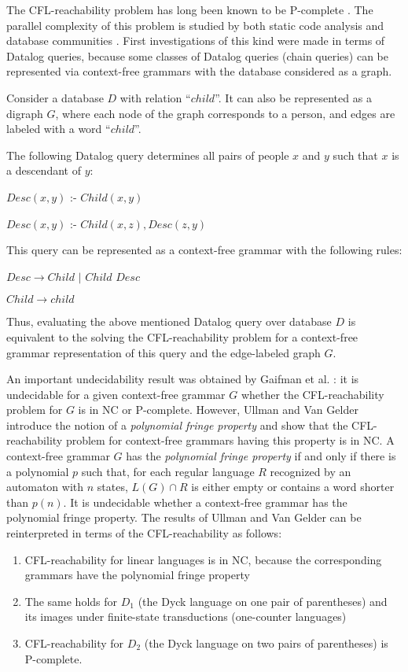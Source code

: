 \documentclass{ws-ijfcs}
\begin{document}
The CFL-reachability problem has long been known to be P-complete \cite{PCompl}. The parallel complexity of this problem is studied by both static code analysis \cite{RepSeq, RepsBasic} and database communities \cite{ChainQ, Ullman, Yannakakis}. First investigations of this kind were made in terms of Datalog queries, because some classes of Datalog queries (chain queries) can be represented via context-free grammars with the database considered as a graph. 
\begin{example}
Consider a database  $D$ with relation ``$child$''. It can also be represented as a digraph $G$, where each node of the graph corresponds to a person, and edges are labeled with a word ``$child$''.


The following Datalog query determines all pairs of people $x$ and $y$ such that $x$ is a descendant of $y$: 


$Desc(x, y)$ :- $Child(x, y)$

$Desc(x, y)$ :- $Child(x, z), Desc(z, y)$


This query can be represented as a context-free grammar with the following rules: 


$Desc \rightarrow Child$ $\vert$ $Child$ $Desc$


$Child  \rightarrow child$


Thus, evaluating the above mentioned Datalog query over database $D$ is equivalent to the solving the CFL-reachability problem for a context-free grammar representation of this query and the edge-labeled graph $G$.
\end{example}
An important undecidability result was obtained by Gaifman et al. \cite{Vardi}:  it is undecidable for a given context-free grammar $G$ whether the CFL-reachability problem for $G$ is in NC or P-complete. However, Ullman and Van Gelder \cite{Ullman} introduce the notion of a \textit{polynomial fringe property} and show that the CFL-reachability problem for context-free grammars having this property is in NC. A context-free grammar $G$ has the \textit{polynomial fringe property} if and only if there is a polynomial $p$ such that, for each regular language $R$ recognized by an automaton with $n$ states, $L(G) \cap R$ is either empty or contains a word shorter than $p(n)$. It is undecidable whether a context-free grammar has the polynomial fringe property. The results of Ullman and Van Gelder \cite{Ullman} can be reinterpreted in terms of the CFL-reachability as follows: 
\begin{enumerate}
\item CFL-reachability for linear languages is in NC, because the corresponding grammars have the polynomial fringe property
\item The same holds for $D_1$ (the Dyck language on one pair of parentheses) and its images under finite-state transductions (one-counter languages)
\item CFL-reachability for $D_2$ (the Dyck language on two pairs of parentheses) is P-complete.
\end{enumerate}
\end{document}
